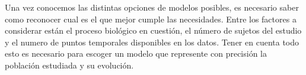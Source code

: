 \documentclass[12pt]{article}
\begin{document}
Una vez conocemos las distintas opciones de modelos posibles, es necesario saber como reconocer cual es el que mejor cumple las necesidades. Entre los factores a considerar están el proceso biológico en cuestión, el número de sujetos del estudio y el numero de puntos temporales disponibles en los datos. Tener en cuenta todo esto es necesario para escoger un modelo que represente con precisión la población estudiada y su evolución.
\end{document}
